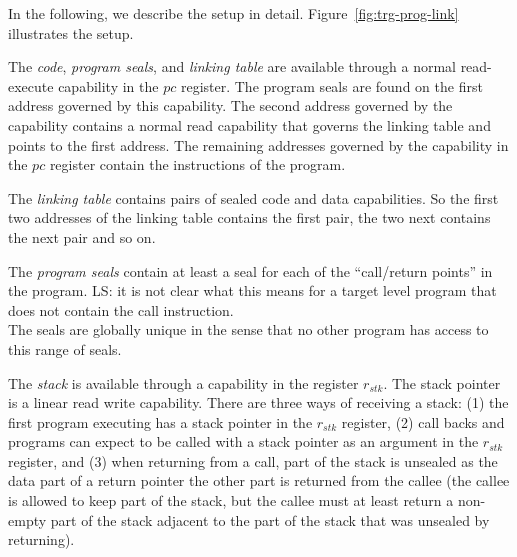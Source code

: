 \documentclass[a3paper]{article}
\newcommand\lau[1]{{\color{purple} \sf \footnotesize {LS: #1}}\\}
\newcommand{\var}[1]{\mathit{#1}}
\newcommand{\pc}{\var{pc}}
\newcommand{\stk}{\var{stk}}
\begin{document}
In the following, we describe the setup in detail. Figure~\ref{fig:trg-prog-link} illustrates the setup.

The \emph{code}, \emph{program seals}, and \emph{linking table} are available through a normal read-execute capability in the $\pc$ register. The program seals are found on the first address governed by this capability. The second address governed by the capability contains a normal read capability that governs the linking table and points to the first address. The remaining addresses governed by the capability in the $\pc$ register contain the instructions of the program.

The \emph{linking table} contains pairs of sealed code and data capabilities. So the first two addresses of the linking table contains the first pair, the two next contains the next pair and so on.

The \emph{program seals} contain at least a seal for each of the ``call/return points'' in the program.\lau{it is not clear what this means for a target level program that does not contain the call instruction.} The seals are globally unique in the sense that no other program has access to this range of seals.

The \emph{stack} is available through a capability in the register $r_\stk$. The stack pointer is a linear read write capability. There are three ways of receiving a stack: (1) the first program executing has a stack pointer in the $r_\stk$ register, (2) call backs and programs can expect to be called with a stack pointer as an argument in the $r_\stk$ register, and (3) when returning from a call, part of the stack is unsealed as the data part of a return pointer the other part is returned from the callee (the callee is allowed to keep part of the stack, but the callee must at least return a non-empty part of the stack adjacent to the part of the stack that was unsealed by returning).
\end{document}
